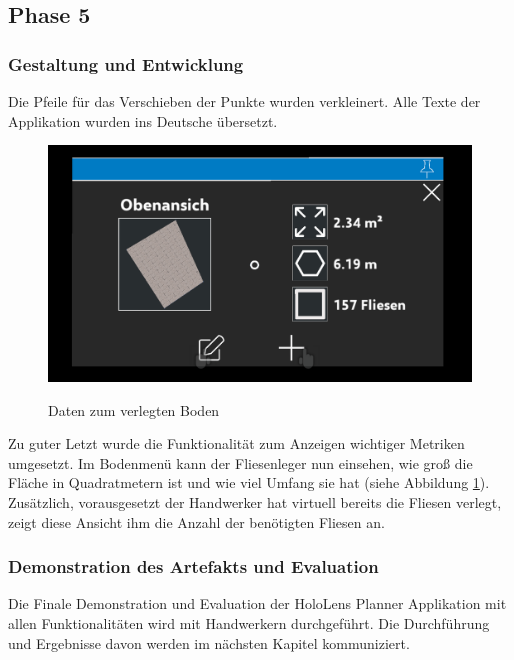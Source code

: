 \subsection{Phase 5}

\subsubsection{Gestaltung und Entwicklung}

Die Pfeile für das Verschieben der Punkte wurden verkleinert. Alle Texte der Applikation wurden ins Deutsche übersetzt.

\begin{figure}[h]
	\begin{center}
		\noindent\includegraphics[scale=0.4]{Resources/Artefakt/datenBoden.png}
		\label{daten}
		\caption{Daten zum verlegten Boden}	
	\end{center}
\end{figure}

Zu guter Letzt wurde die Funktionalität zum Anzeigen wichtiger Metriken umgesetzt. Im Bodenmenü kann der Fliesenleger nun einsehen, wie groß die Fläche in Quadratmetern ist und wie viel Umfang sie hat (siehe Abbildung \ref{daten}). Zusätzlich, vorausgesetzt der Handwerker hat virtuell bereits die Fliesen verlegt, zeigt diese Ansicht ihm die Anzahl der benötigten Fliesen an.

\subsubsection{Demonstration des Artefakts und Evaluation}

Die Finale Demonstration und Evaluation der HoloLens Planner Applikation mit allen Funktionalitäten wird mit Handwerkern durchgeführt. Die Durchführung und Ergebnisse davon werden im nächsten Kapitel kommuniziert. 